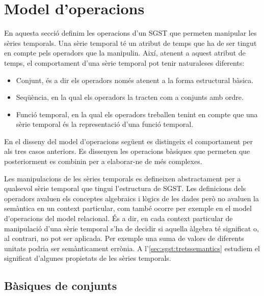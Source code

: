 \section{Model d'operacions}
\label{sec:model:sgst-operacions}

En aquesta secció definim les operacions d'un \gls{SGST} que permeten
manipular les sèries temporals.  Una sèrie temporal té un atribut de
temps que ha de ser tingut en compte pels operadors que la manipulin.
Així, atenent a aquest atribut de temps, el comportament d'una sèrie
temporal pot tenir naturaleses diferents:
\begin{itemize}
\item Conjunt, és a dir els operadors només atenent a la forma
  estructural bàsica.
\item Seqüència, en la qual els operadors la tracten com a conjunts
  amb ordre.
\item Funció temporal, en la qual els operadors treballen tenint en
  compte que una sèrie temporal és la representació d'una funció
  temporal.
\end{itemize}



En el disseny del model d'operacions següent es distingeix el
comportament per als tres casos anteriors.  Es dissenyen les
operacions bàsiques que permeten que posteriorment es combinin per
a elaborar-ne de més complexes.


Les manipulacions de les sèries temporals es defineixen abstractament
per a qualsevol sèrie temporal que tingui l'estructura de \gls{SGST}.
Les definicions dels operadors avaluen els conceptes algebraics i
lògics de les dades però no avaluen la semàntica en un context
particular, com també ocorre per exemple en el model d'operacions del
model relacional. És a dir, en cada context particular de manipulació
d'una sèrie temporal s'ha de decidir si aquella àlgebra té significat
o, al contrari, no pot ser aplicada. Per exemple una suma de valors de
diferents unitats podria ser semànticament errònia. A
l'\autoref{sec:sgst:tretssemantics} estudiem el significat d'algunes
propietats de les sèries temporals.





\subsection{Bàsiques de conjunts}

